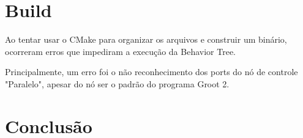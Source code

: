 \documentclass[a4 paper]{article}
\newcommand{\parag}{\hspace{30pt}}
\begin{document}
\section{Build}
\parag Ao tentar usar o CMake para organizar os arquivos e construir um binário, ocorreram erros que impediram a execução da Behavior Tree. 

Principalmente, um erro foi o não reconhecimento dos ports do nó de controle "Paralelo", apesar do nó ser o padrão do programa Groot 2. 




\section{Conclusão}
\end{document}
